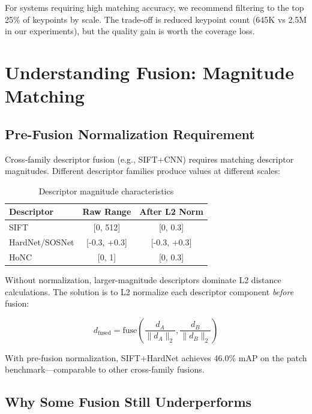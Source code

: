 For systems requiring high matching accuracy, we recommend filtering to the top 25\% of keypoints by scale. The trade-off is reduced keypoint count (645K vs 2.5M in our experiments), but the quality gain is worth the coverage loss.

\section{Understanding Fusion: Magnitude Matching}

\subsection{Pre-Fusion Normalization Requirement}

Cross-family descriptor fusion (e.g., SIFT+CNN) requires matching descriptor magnitudes. Different descriptor families produce values at different scales:

\begin{table}[h]
\centering
\caption{Descriptor magnitude characteristics}
\begin{tabular}{lcc}
\toprule
\textbf{Descriptor} & \textbf{Raw Range} & \textbf{After L2 Norm} \\
\midrule
SIFT & [0, 512] & [0, 0.3] \\
HardNet/SOSNet & [-0.3, +0.3] & [-0.3, +0.3] \\
HoNC & [0, 1] & [0, 0.3] \\
\bottomrule
\end{tabular}
\end{table}

Without normalization, larger-magnitude descriptors dominate L2 distance calculations. The solution is to L2 normalize each descriptor component \textit{before} fusion:

\begin{equation}
    d_{\text{fused}} = \text{fuse}\left(\frac{d_A}{\|d_A\|_2}, \frac{d_B}{\|d_B\|_2}\right)
\end{equation}

With pre-fusion normalization, SIFT+HardNet achieves 46.0\% mAP on the patch benchmark---comparable to other cross-family fusions.

\subsection{Why Some Fusion Still Underperforms}


